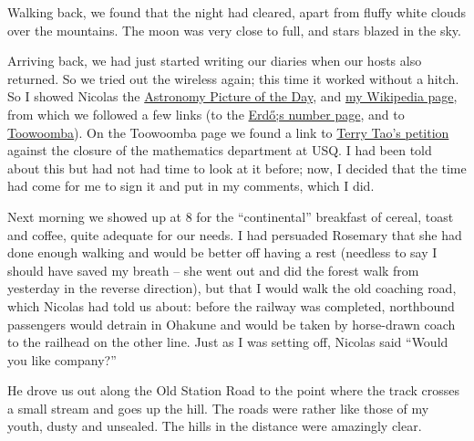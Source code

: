 \documentclass[12pt,a4paper]{article}
\begin{document}
Walking back, we found that the night had cleared, apart from fluffy white
clouds over the mountains. The moon was very close to full, and stars blazed
in the sky.

Arriving back, we had  just started writing our diaries when our hosts
also returned. So we tried out the wireless again; this time it worked
without a hitch. So I showed Nicolas the 
\href{http://antwrp.gsfc.nasa.gov/apod/astropix.html}{Astronomy
Picture of the Day},
and 
\href{http://en.wikipedia.org/wiki/Peter_Cameron_%28mathematician%29}{my
Wikipedia page}, from which we followed a few links (to the 
\href{http://en.wikipedia.org/wiki/Erd%C5%91s_number}{Erd\H{o};s
number page}, and to 
\href{http://en.wikipedia.org/wiki/Toowoomba}{Toowoomba}). On the 
Toowoomba page we found a link to
\href{http://terrytao.wordpress.com/about/petition-to-support-maths-statistics-and-computing-at-usq/}{Terry Tao's petition}
against the closure of the mathematics department at USQ. I had been told 
about this but had not had time to look at it
before; now, I decided that the time had come for me to sign it and put
in my comments, which I did.

Next morning we showed up at 8 for the ``continental'' breakfast of cereal,
toast and coffee, quite adequate for our needs. I had persuaded Rosemary
that she had done enough walking and would be better off having a rest
(needless to say I should have saved my breath -- she went out and did the
forest walk from yesterday in the reverse direction),
but that I would walk the old coaching road, which Nicolas had told us
about: before the railway was completed, northbound passengers would
detrain in Ohakune and would be taken by horse-drawn coach to the railhead
on the other line. Just as I was setting off, Nicolas said ``Would you like
company?''

He drove us out along the Old Station Road to the point where the track 
crosses a small stream and goes up the hill. The roads were rather like those
of my youth, dusty and unsealed. The hills in the distance were amazingly
clear.
\end{document}
